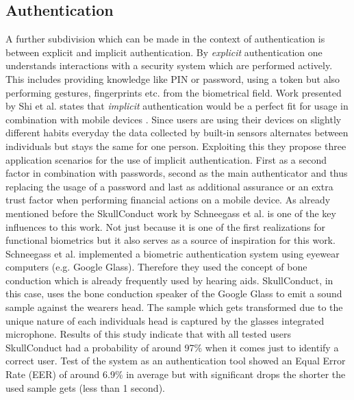 \subsection{Authentication} 
A further subdivision which can be made in the context of authentication is between explicit and implicit authentication. By \textit{explicit}  authentication one understands interactions with a security system which are performed actively. This includes providing knowledge like PIN or password, using a token but also performing gestures, fingerprints etc. from the biometrical field.\newline 
Work presented by Shi et al. states that \textit{implicit} authentication would be a perfect fit for usage in combination with mobile devices \cite{shi2010implicit}. Since users are using their devices on slightly different habits everyday the data collected by built-in sensors alternates between individuals but stays the same for one person. Exploiting this they propose three application scenarios for the use of implicit authentication.\newline
First as a second factor in combination with passwords, second as the main authenticator and thus replacing the usage of a password and last as additional assurance or an extra trust factor when performing financial actions on a mobile device.
\newline
\newline
\newline
As already mentioned before the SkullConduct work by Schneegass et al. is one of the key influences to this work. Not just because it is one of the first realizations for functional biometrics but it also 
serves as a source of inspiration for this work.\newline
Schneegass et al. implemented a biometric authentication system using eyewear computers (e.g. Google Glass). Therefore they used the concept of bone conduction which is already frequently used by hearing aids. SkullConduct, in this case, uses the bone conduction speaker of the Google Glass to emit a sound sample against the wearers head. The sample which gets transformed due to the unique  
nature of each individuals head is captured by the glasses integrated microphone.\newline
Results of this study  indicate that with all tested users SkullConduct had a probability of around 97\% when it comes just to identify a correct user. Test of the system as an authentication tool showed an Equal Error Rate (EER) of around 6.9\% in average but with significant drops the shorter the used sample gets (less than 1 second).
